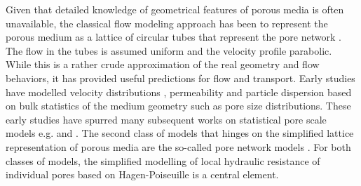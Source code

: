 \documentclass[draft]{agujournal2019}
\begin{document}
Given that detailed knowledge of geometrical features of porous media is often unavailable, the classical flow modeling approach has been to represent the porous medium as a lattice of circular tubes that represent the pore network \cite{scheidegger_physics_1974}. The flow in the tubes is assumed uniform and the velocity profile parabolic. While this is a rather crude approximation of the real geometry and flow behaviors, it has provided useful predictions for flow and transport. Early studies have modelled velocity distributions \cite{haring_statistical_1970}, permeability \cite{fatt_network_1956,katz_quantitative_1986} and particle dispersion \cite{saffman_theory_1959} based on bulk statistics of the medium geometry such as pore size distributions. These early studies have spurred many subsequent works on statistical pore scale models e.g.  and . The second class of models that hinges on the simplified lattice representation of porous media are the so-called pore network models \cite{thompson_modeling_1997}. For both classes of models, the simplified modelling of local hydraulic resistance of individual pores based on Hagen-Poiseuille is a central element.
\end{document}
